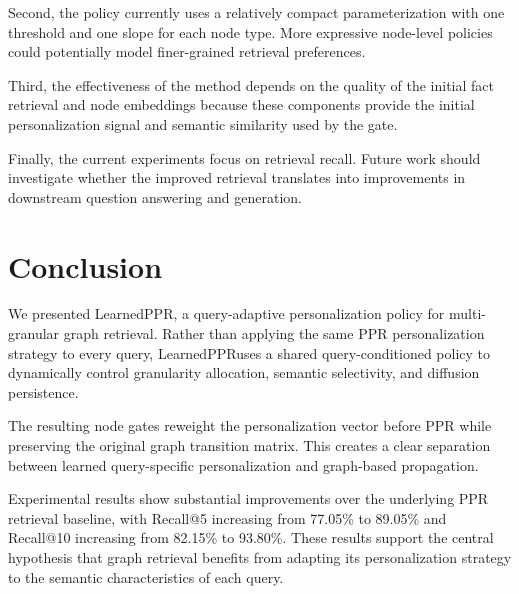 \documentclass[conference]{IEEEtran}
\newcommand{\method}{LearnedPPR}
\begin{document}
Second, the policy currently uses a relatively compact parameterization
with one threshold and one slope for each node type. More expressive
node-level policies could potentially model finer-grained retrieval
preferences.

Third, the effectiveness of the method depends on the quality of the
initial fact retrieval and node embeddings because these components
provide the initial personalization signal and semantic similarity
used by the gate.

Finally, the current experiments focus on retrieval recall. Future
work should investigate whether the improved retrieval translates
into improvements in downstream question answering and generation.


\section{Conclusion}

We presented \method, a query-adaptive personalization policy for
multi-granular graph retrieval. Rather than applying the same PPR
personalization strategy to every query, \method uses a shared
query-conditioned policy to dynamically control granularity allocation,
semantic selectivity, and diffusion persistence.

The resulting node gates reweight the personalization vector before
PPR while preserving the original graph transition matrix. This
creates a clear separation between learned query-specific
personalization and graph-based propagation.

Experimental results show substantial improvements over the underlying
PPR retrieval baseline, with Recall@5 increasing from 77.05\% to
89.05\% and Recall@10 increasing from 82.15\% to 93.80\%. These
results support the central hypothesis that graph retrieval benefits
from adapting its personalization strategy to the semantic
characteristics of each query.




\balance
\end{document}
